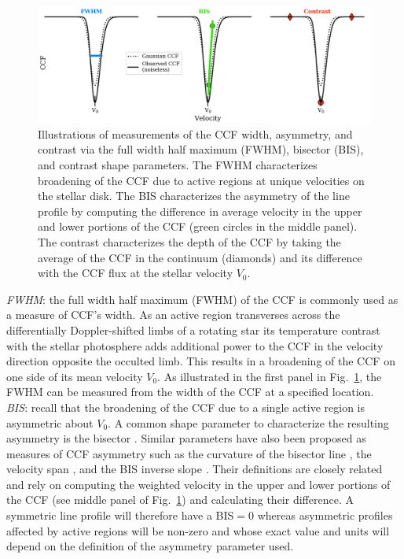 \begin{figure}
  \centering
  \includegraphics[width=\hsize]{figures/ccf.png}
  \caption[Illustrations of CCF shape parameters.]
          {Illustrations of measurements of the CCF width, asymmetry, and contrast via the full
            width half maximum (FWHM), bisector (BIS), and contrast shape parameters. The FWHM
            characterizes broadening of the CCF due to active regions at unique velocities on the
            stellar disk. The
            BIS characterizes the asymmetry of the line profile by computing the difference in
            average velocity in the upper and lower portions of the CCF (green circles in the
            middle panel). The contrast characterizes the depth of the CCF by taking the average
            of the CCF in the continuum (diamonds) and its difference with the CCF flux at the
            stellar velocity $V_0$.}
  \label{fig:ccf}
\end{figure}

\emph{FWHM}:
the full width half maximum (FWHM) of the CCF is commonly used as a measure of CCF's
width. As an active region transverses across the differentially
Doppler-shifted limbs of a rotating star
its temperature contrast with the stellar photosphere adds additional
power to the CCF in the velocity direction opposite the occulted limb. This results in a
broadening of the CCF on one side of its mean velocity $V_0$. As illustrated in
the first panel in Fig.~\ref{fig:ccf},
the FWHM can be measured from the width of the CCF at a specified location. \\

\emph{BIS}:
recall that the broadening of the CCF due to a single active region is asymmetric about $V_0$.
A common shape parameter to characterize the resulting asymmetry is the bisector
\citep[BIS;][]{queloz01}.
Similar parameters have also been proposed as measures of CCF asymmetry such as the curvature of
the bisector line \citep{hatzes96}, the velocity span \citep{boisse11}, and the BIS inverse
slope \citep{queloz01}. Their definitions are closely related and rely on computing the weighted
velocity in the upper and lower portions of the CCF (see middle panel of Fig.~\ref{fig:ccf})
and calculating their difference. A symmetric line profile will therefore have a BIS$=0$ whereas
asymmetric profiles affected by active regions will be non-zero and whose exact value and units
will depend on the definition of the asymmetry parameter used. \\

